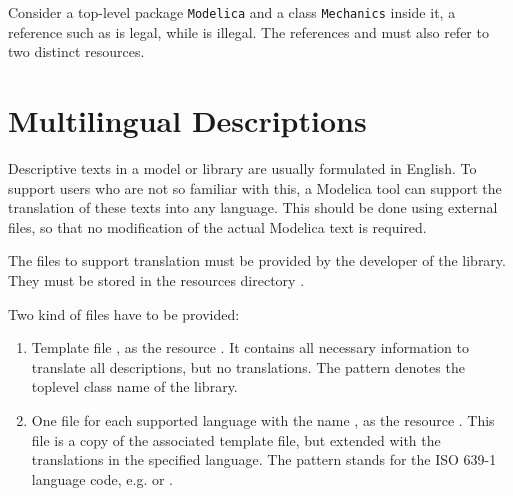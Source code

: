 \begin{example}
Consider a top-level package \lstinline!Modelica! and a class
\lstinline!Mechanics! inside it, a reference such as
 is legal, while
 is illegal.
The references  and  must also refer to two distinct resources.
\end{example}

\section{Multilingual Descriptions}\label{multilingual-descriptions}

\begin{nonnormative}
Descriptive texts in a model or library are usually formulated in English.
To support users who are not so familiar with this, a Modelica tool can support the translation of these texts into any language.
This should be done using external files, so that no modification of the actual Modelica text is required.
\end{nonnormative}

The files to support translation must be provided by the developer of the library.
They must be stored in the resources directory .

Two kind of files have to be provided:
\begin{enumerate}
\item Template file , as the resource .
It contains all necessary information to translate all descriptions, but no translations.
The pattern  denotes the toplevel class name of the library.
\item One file for each supported language with the name , as the resource .
This file is a copy of the associated template file, but extended with the translations in the specified language.
The pattern  stands for the ISO 639-1 language code, e.g.  or .
\end{enumerate}


